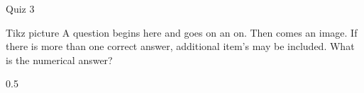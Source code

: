 \documentclass[12pt]{article}
\begin{document}
\begin{quiz}{Quiz 3}
\begin{numerical}{Tikz picture}
A question begins here and goes on an on. Then comes an image. 
If there is more than one correct answer, additional item's 
may be included. What is the numerical answer?

%
\item 0.5
\end{numerical}

\end{quiz}
\end{document}
